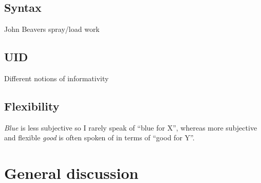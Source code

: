 \documentclass[11pt]{article}
\begin{document}
\subsection{Syntax}

John Beavers spray/load work

\subsection{UID}

Different notions of informativity

\subsection{Flexibility}

\emph{Blue} is less subjective so I rarely speak of ``blue for X'', whereas more subjective and flexible \emph{good} is often spoken of in terms of ``good for Y''.


\section{General discussion}
\end{document}
